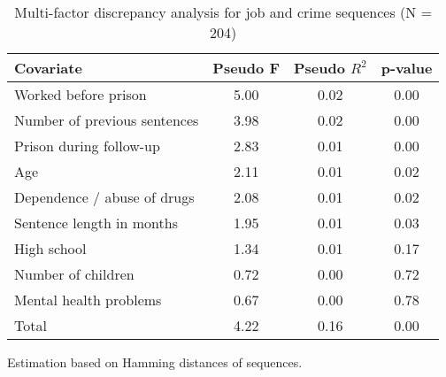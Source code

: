 \begin{table}[htp]
\footnotesize
\setlength{\tabcolsep}{10pt}
\renewcommand{\arraystretch}{1.3}
\begin{threeparttable}
\centering
\caption{Multi-factor discrepancy analysis for job and crime sequences (N = 204)} 
\label{tab:discrepancy_crime_job}
\begin{tabular}{lccc}
  \hline
Covariate & Pseudo F & Pseudo $R^2$ & p-value \\ 
  \hline
Worked before prison & 5.00 & 0.02 & 0.00 \\ 
  Number of previous sentences & 3.98 & 0.02 & 0.00 \\ 
  Prison during follow-up & 2.83 & 0.01 & 0.00 \\ 
  Age & 2.11 & 0.01 & 0.02 \\ 
  Dependence / abuse of drugs & 2.08 & 0.01 & 0.02 \\ 
  Sentence length in months & 1.95 & 0.01 & 0.03 \\ 
  High school & 1.34 & 0.01 & 0.17 \\ 
  Number of children & 0.72 & 0.00 & 0.72 \\ 
  Mental health problems & 0.67 & 0.00 & 0.78 \\ 
  Total & 4.22 & 0.16 & 0.00 \\ 
   \hline
\end{tabular}
\begin{tablenotes}
\scriptsize
\item Estimation based on Hamming distances of sequences.
\end{tablenotes}
\end{threeparttable}
\end{table}
